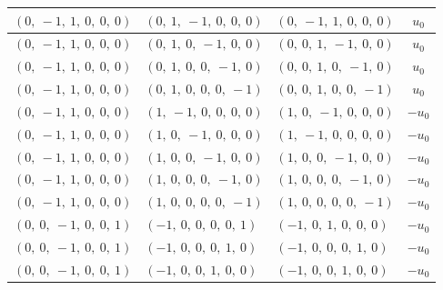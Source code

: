 \documentclass[11pt]{article}
\theoremstyle{definition}
\begin{document}
\begin{longtable}{|l|l|l|c|}
    \hline
    $\left( 0, \  -1, \  1, \  0, \  0, \  0\right)$ & $\left( 0, \  1, \  -1, \  0, \  0, \  0\right)$ & $\left( 0, \  -1, \  1, \  0, \  0, \  0\right)$ & $u_{0}$ \\
    \hline
    $\left( 0, \  -1, \  1, \  0, \  0, \  0\right)$ & $\left( 0, \  1, \  0, \  -1, \  0, \  0\right)$ & $\left( 0, \  0, \  1, \  -1, \  0, \  0\right)$ & $u_{0}$ \\
    \hline
    $\left( 0, \  -1, \  1, \  0, \  0, \  0\right)$ & $\left( 0, \  1, \  0, \  0, \  -1, \  0\right)$ & $\left( 0, \  0, \  1, \  0, \  -1, \  0\right)$ & $u_{0}$ \\
    \hline
    $\left( 0, \  -1, \  1, \  0, \  0, \  0\right)$ & $\left( 0, \  1, \  0, \  0, \  0, \  -1\right)$ & $\left( 0, \  0, \  1, \  0, \  0, \  -1\right)$ & $u_{0}$ \\
    \hline
    $\left( 0, \  -1, \  1, \  0, \  0, \  0\right)$ & $\left( 1, \  -1, \  0, \  0, \  0, \  0\right)$ & $\left( 1, \  0, \  -1, \  0, \  0, \  0\right)$ & $- u_{0}$ \\
    \hline
    $\left( 0, \  -1, \  1, \  0, \  0, \  0\right)$ & $\left( 1, \  0, \  -1, \  0, \  0, \  0\right)$ & $\left( 1, \  -1, \  0, \  0, \  0, \  0\right)$ & $- u_{0}$ \\
    \hline
    $\left( 0, \  -1, \  1, \  0, \  0, \  0\right)$ & $\left( 1, \  0, \  0, \  -1, \  0, \  0\right)$ & $\left( 1, \  0, \  0, \  -1, \  0, \  0\right)$ & $- u_{0}$ \\
    \hline
    $\left( 0, \  -1, \  1, \  0, \  0, \  0\right)$ & $\left( 1, \  0, \  0, \  0, \  -1, \  0\right)$ & $\left( 1, \  0, \  0, \  0, \  -1, \  0\right)$ & $- u_{0}$ \\
    \hline
    $\left( 0, \  -1, \  1, \  0, \  0, \  0\right)$ & $\left( 1, \  0, \  0, \  0, \  0, \  -1\right)$ & $\left( 1, \  0, \  0, \  0, \  0, \  -1\right)$ & $- u_{0}$ \\
    \hline
    $\left( 0, \  0, \  -1, \  0, \  0, \  1\right)$ & $\left( -1, \  0, \  0, \  0, \  0, \  1\right)$ & $\left( -1, \  0, \  1, \  0, \  0, \  0\right)$ & $- u_{0}$ \\
    \hline
    $\left( 0, \  0, \  -1, \  0, \  0, \  1\right)$ & $\left( -1, \  0, \  0, \  0, \  1, \  0\right)$ & $\left( -1, \  0, \  0, \  0, \  1, \  0\right)$ & $- u_{0}$ \\
    \hline
    $\left( 0, \  0, \  -1, \  0, \  0, \  1\right)$ & $\left( -1, \  0, \  0, \  1, \  0, \  0\right)$ & $\left( -1, \  0, \  0, \  1, \  0, \  0\right)$ & $- u_{0}$ \\

\end{longtable}
\end{document}
